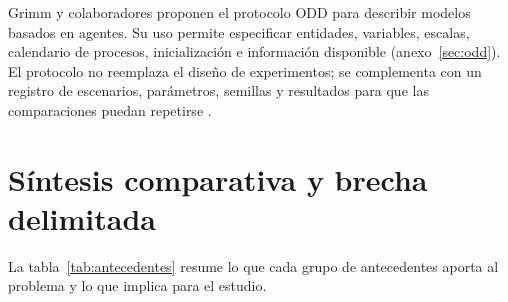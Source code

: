 Grimm y colaboradores \cite{grimm2020odd} proponen el protocolo ODD para describir modelos basados en agentes. Su uso permite especificar entidades, variables, escalas, calendario de procesos, inicialización e información disponible (anexo~\ref{sec:odd}). El protocolo no reemplaza el diseño de experimentos; se complementa con un registro de escenarios, parámetros, semillas y resultados para que las comparaciones puedan repetirse \cite{railsback2019agent,thiele2014facilitating}.

\section{Síntesis comparativa y brecha delimitada}

La tabla~\ref{tab:antecedentes} resume lo que cada grupo de antecedentes aporta al problema y lo que implica para el estudio.

